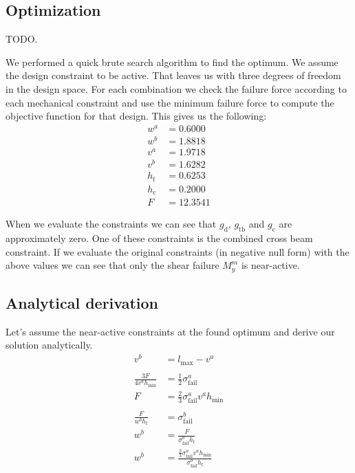 \subsection{Optimization}

TODO.

We performed a quick brute search algorithm to find the optimum.
We assume the design constraint to be active.
That leaves us with three degrees of freedom in the design space.
For each combination we check the failure force according to each mechanical constraint 
and use the minimum failure force to compute the objective function for that design.
This gives us the following:
\begin{align*}
	w^a	&=0.6000 \\
	w^b	&=1.8818 \\
	v^a	&=1.9718 \\
	v^b	&=1.6282 \\
	h_\text{f}	&=0.6253 \\
	h_\text{c}	&=0.2000 \\
	F	&=12.3541 
\end{align*}

When we evaluate the constraints we can see that $g_\text{d}$, $g_\text{tb}$ and $g_\text{c}$ are approximately zero.
One of these constraints is the combined cross beam constraint.
If we evaluate the original constraints (in negative null form) with the above values we can see that only the shear failure $M_y^m$ is near-active.

\subsection{Analytical derivation}
Let's assume the near-active constraints at the found optimum and derive our solution analytically.
\begin{align*}
	v^b &= l_\text{max} - v^a \\
	\\
	\frac{ 3 F }{ 4 v^a h_\text{min}} &= \frac12 \sigma^a_\text{fail}	\\
	F &= \frac23 \sigma^a_\text{fail}v^a h_\text{min} \\
	\\
	\frac{ F }{ w^b h_\text{f} } &= \sigma^b_\text{fail} \\
	w^b  &= \frac{F}{\sigma^b_\text{fail}  h_\text{f}} \\
	w^b  &= \frac{\frac23 \sigma^a_\text{fail}v^a h_\text{min}}{\sigma^b_\text{fail}  h_\text{f}} \\
\end{align*}

